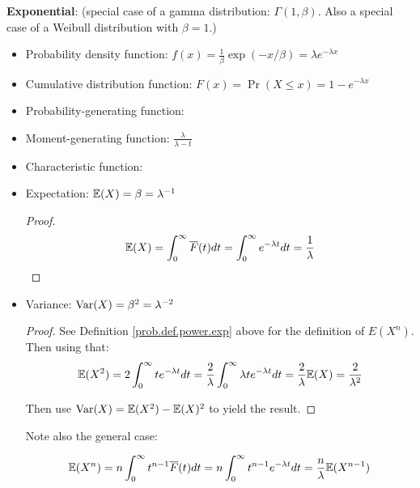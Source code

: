 
\textbf{Exponential}: \label{prob.exp} (special case of a gamma distribution: \(\Gamma(1, \beta)\). Also a special case of a Weibull distribution with \(\beta = 1\).)

\begin{itemize}

\item Probability density function: \(f(x) = \frac{1}{\beta} \exp(-x/\beta) = \lambda e^{- \lambda x} \)

\item Cumulative distribution function: \(F(x) = \Pr(X \leq x) = 1 - e^{-\lambda x}\)

\item Probability-generating function:

\item Moment-generating function: \(\frac{\lambda}{\lambda - t}\)

\item Characteristic function:

\item Expectation: \(\E(X) = \beta = \lambda^{-1} \)

\begin{proof}

\[
 \E(X) = \int_0^\infty \overline{F}(t)dt = \int_0^\infty e^{-\lambda t} dt = \frac{1}{\lambda}
 \]

\end{proof}

\item Variance: \(\Var(X) = \beta^2 = \lambda^{-2}  \)

\begin{proof} See Definition \ref{prob.def.power.exp} above for the definition of \(E(X^n)\). Then using that:
\[
\E(X^2) = 2 \int_0^\infty t e^{-\lambda t} dt = \frac{2}{\lambda} \int_0^\infty \lambda t e^{-\lambda t} dt = \frac{2}{\lambda} \E(X) = \frac{2}{\lambda^2}
\]

Then use \(\Var(X) = \E(X^2) - \E(X)^2\) to yield the result. 
\end{proof}

\begin{remark} Note also the general case:

\[
\E(X^n) = n \int_0^\infty t^{n-1} \overline{F}(t) dt = n \int_0^\infty t^{n-1} e^{-\lambda t} dt = \frac{n}{\lambda} \E(X^{n-1})
\]

\end{remark}


\end{itemize}
